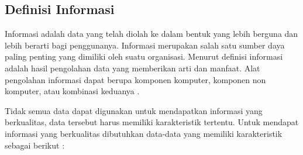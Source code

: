 \subsection{Definisi Informasi}
	Informasi adalah data yang telah diolah ke dalam bentuk yang lebih berguna dan lebih berarti bagi penggunanya. Informasi merupakan salah satu sumber daya paling penting yang dimiliki oleh suatu organisasi. Menurut \cite{Susanto2017} definisi informasi adalah hasil pengolahan data yang memberikan arti dan manfaat. Alat pengolahan informasi dapat berupa komponen komputer, komponen non komputer, atau kombinasi keduanya \citep{Ladjamudin2005}.

	Tidak semua data dapat digunakan untuk mendapatkan informasi yang berkualitas, data tersebut harus memiliki karakteristik tertentu. Untuk mendapat informasi yang berkualitas dibutuhkan data-data yang memiliki karakteristik sebagai berikut \citep{Kroenke2009}:
